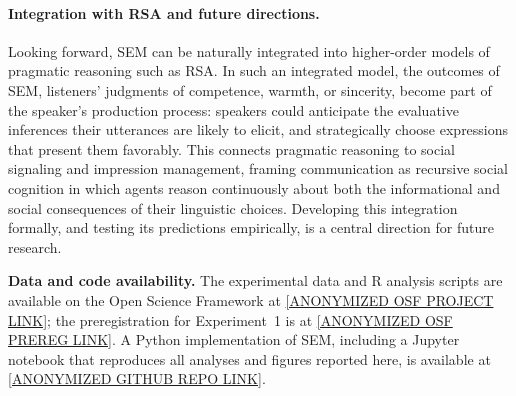 \documentclass[12pt,a4paper]{article}
\begin{document}
\paragraph{Integration with RSA and future directions.}
Looking forward, SEM can be naturally integrated into higher-order models of
pragmatic reasoning such as RSA. In such an integrated model, the outcomes of
SEM, listeners' judgments of competence, warmth, or sincerity, become part of
the speaker's production process: speakers could anticipate the evaluative
inferences their utterances are likely to elicit, and strategically choose
expressions that present them favorably. This connects pragmatic reasoning to
social signaling and impression management, framing communication as recursive
social cognition in which agents reason continuously about both the informational
and social consequences of their linguistic choices. Developing this integration
formally, and testing its predictions empirically, is a central direction for
future research.

\bigskip

\noindent\textbf{Data and code availability.}
The experimental data and R analysis scripts are available on the Open Science
Framework at \url{[ANONYMIZED OSF PROJECT LINK]}; the preregistration for
Experiment~1 is at \url{[ANONYMIZED OSF PREREG LINK]}. A Python implementation of
SEM, including a Jupyter notebook that reproduces all analyses and figures
reported here, is available at \url{[ANONYMIZED GITHUB REPO LINK]}.


\printbibliography
\end{document}
